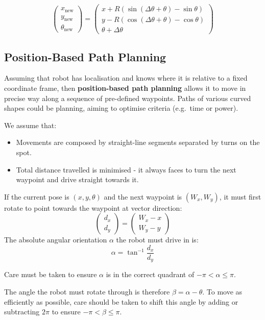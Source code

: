 \documentclass[11pt]{article}
\begin{document}
\[
  \begin{pmatrix}
    x_{\text{new}} \\
    y_{\text{new}} \\
    \theta_{\text{new}} 
  \end{pmatrix}
  =
  \begin{pmatrix}
    x + R(\sin(\Delta \theta + \theta) - \sin \theta) \\
    y - R(\cos(\Delta \theta + \theta) - \cos \theta) \\
    \theta + \Delta \theta
  \end{pmatrix}
\]

\subsection{Position-Based Path Planning}
Assuming that robot has localisation and knows where it is relative to a fixed coordinate frame, then \textbf{position-based path planning} allows it to move in precise way along a sequence of pre-defined waypoints.
Paths of various curved shapes could be planning, aiming to optimise criteria (e.g.\ time or power).

We assume that:
\begin{itemize}
  \item Movements are composed by straight-line segments separated by turns on the spot.
  \item Total distance travelled is minimised - it always faces to turn the next waypoint and drive straight towards it.
\end{itemize}

If the current pose is $(x, y, \theta)$ and the next waypoint is $(W_x, W_y)$, it must first rotate to point towards the waypoint at vector direction:
\[
  \begin{pmatrix}
    d_x \\
    d_y
  \end{pmatrix}
  =
  \begin{pmatrix}
    W_x - x \\
    W_y - y
  \end{pmatrix}
\]
The absolute angular orientation $\alpha$ the robot must drive in is:
\[
  \alpha = \tan^{-1} \frac{d_x}{d_y}
\]

Care must be taken to ensure $\alpha$ is in the correct quadrant of $-\pi < \alpha \leq \pi$.

The angle the robot must rotate through is therefore $\beta = \alpha - \theta$.
To move as efficiently as possible, care should be taken to shift this angle by adding or subtracting $2\pi$ to ensure $-\pi < \beta \leq \pi$.
\end{document}
